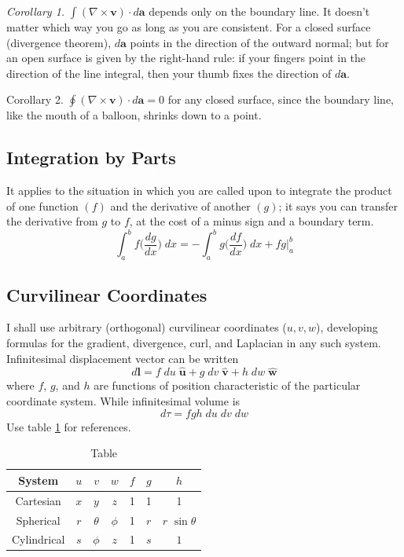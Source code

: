 \documentclass[../main.tex]{subfiles}
\begin{document}
\emph{Corollary 1.} $\int (\nabla \times \mathbf{v})\cdot d\mathbf{a}$ depends only on the boundary line. It doesn't matter which way you go as long as you are consistent. For a closed surface (divergence theorem), $d\mathbf{a}$ points in the direction of the outward normal; but for an open surface is given by the right-hand rule: if your ﬁngers point in the direction of the line integral, then your thumb ﬁxes the direction of $d\mathbf{a}$.

Corollary 2. $\oint (\nabla \times \mathbf{v})\cdot d\mathbf{a}=0$ for any closed surface, since the boundary line, like the mouth of a balloon, shrinks down to a point.

\subsection{Integration by Parts}
It applies to the situation in which you are called upon to integrate the product of one function $( f )$ and the derivative of another $(g)$; it says you can transfer the derivative from $g$ to $f$, at the cost of a minus sign and a boundary term.
\begin{equation*}
    \int_{a}^{b} f\bigg(\frac{dg}{dx}\bigg)\;dx=-\int_{a}^{b} g\bigg(\frac{df}{dx}\bigg)\;dx+ fg \bigg\lvert_{a}^{b}
\end{equation*}

\subsection{Curvilinear Coordinates}
I shall use arbitrary (orthogonal) curvilinear coordinates ($u, v, w$), developing formulas for the gradient, divergence, curl, and Laplacian in any such system. Infinitesimal displacement vector can be written
\begin{equation*}
    d\mathbf{l}=f\;d u \;\mathbf{\hat{u}} +g \;d v \;\mathbf{\hat{v}}+h \;d w \;\mathbf{\hat{w}}
\end{equation*}
where $f$, $g$, and $h$ are functions of position characteristic of the particular coordinate system. While infinitesimal volume is
\begin{equation*}
    d\tau=fgh\; du \;dv \;dw
\end{equation*}
Use table \ref{T1} for references.

\begin{table}
    \centering
    \caption{Table}
    \begin{tabular}{c c c c c c c } 
        \toprule
        System&$u$&$v$&$w$&$f$&$g$&$h$\\
        \midrule
        Cartesian&$x$&$y$&$z$&1&1&1\\
        Spherical&$r$&$\theta$&$\phi$&1&$r$&$r$ $\sin \theta$\\
        Cylindrical&$s$&$\phi$&$z$&1&$s$&$1$\\
        \bottomrule
    \end{tabular}
    \label{T1}
\end{table}
\end{document}
